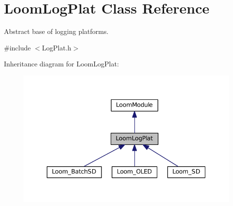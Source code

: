 \hypertarget{class_loom_log_plat}{}\section{Loom\+Log\+Plat Class Reference}
\label{class_loom_log_plat}


Abstract base of logging platforms.  




{\ttfamily \#include $<$Log\+Plat.\+h$>$}



Inheritance diagram for Loom\+Log\+Plat\+:\nopagebreak
\begin{figure}[H]
\begin{center}
\leavevmode
\includegraphics[width=345pt]{class_loom_log_plat__inherit__graph}
\end{center}
\end{figure}
